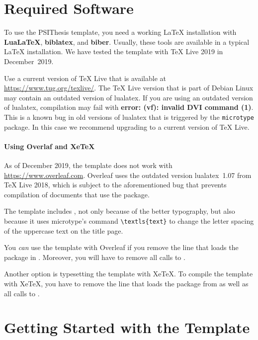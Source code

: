 \section{Required Software}
\label{sec:requirements}

To use the PSIThesis template, you need a working LaTeX installation with \textbf{LuaLaTeX}, \textbf{biblatex}, and \textbf{biber}.%
Usually, these tools are available in a typical LaTeX installation. We have tested the template with TeX Live 2019 in December~2019.

Use a current version of TeX Live that is available at \url{https://www.tug.org/texlive/}. The TeX Live version that is part of Debian Linux may contain an outdated version of lualatex.
If you are using an outdated version of lualatex, compilation may fail with \textbf{error: (vf): invalid DVI command (1)}. This is a known bug in old versions of lualatex that is triggered by the \texttt{microtype} package. In this case we recommend upgrading to a current version of TeX Live.

\paragraph{Using Overlaf and XeTeX}

As of December 2019, the template does not work with \url{https://www.overleaf.com}. Overleaf uses the outdated version lualatex~1.07 from TeX Live 2018, which is subject to the aforementioned bug that prevents compilation of documents that use the  package.

The template includes , not only because of the better typography, but also because it uses microtype's command \verb|\textls{text}| to change the letter spacing of the uppercase text on the title page.

You \emph{can} use the template with Overleaf if you remove the line that loads the  package in . Moreover, you will have to remove all calls to .

Another option is typesetting the template with XeTeX. To compile the template with XeTeX, you have to remove the line that loads the package  from  as well as all calls to .


\section{Getting Started with the Template}

